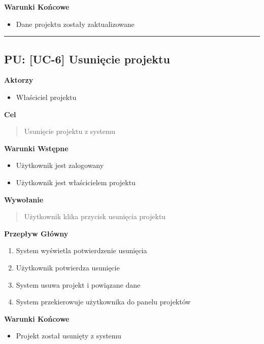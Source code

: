 \vspace{0.2cm}
\noindent\textbf{Warunki Końcowe}
\begin{itemize}
    \item Dane projektu zostały zaktualizowane
\end{itemize}


\hrule
\vspace{1cm}

\subsection*{PU: [UC-6] Usunięcie projektu}

\noindent\textbf{Aktorzy}
\begin{itemize}
    \item Właściciel projektu
\end{itemize}

\vspace{0.2cm}
\noindent\textbf{Cel}
\begin{quote}
    Usunięcie projektu z systemu
\end{quote}

\vspace{0.2cm}
\noindent\textbf{Warunki Wstępne}
\begin{itemize}
    \item Użytkownik jest zalogowany
    \item Użytkownik jest właścicielem projektu
\end{itemize}

\vspace{0.2cm}
\noindent\textbf{Wywołanie}
\begin{quote}
    Użytkownik klika przycisk usunięcia projektu
\end{quote}

\vspace{0.2cm}
\noindent\textbf{Przepływ Główny}
\begin{enumerate}
    \item System wyświetla potwierdzenie usunięcia
    \item Użytkownik potwierdza usunięcie
    \item System usuwa projekt i powiązane dane
    \item System przekierowuje użytkownika do panelu projektów
\end{enumerate}

\vspace{0.2cm}
\noindent\textbf{Warunki Końcowe}
\begin{itemize}
    \item Projekt został usunięty z systemu
\end{itemize}

